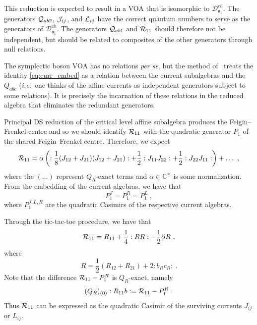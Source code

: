 \documentclass[a4paper]{article}
\def\IC{\mathbb{C}}
\def\JJ{{\cal J}}
\def\LL{{\cal L}}
\def\QQ{{\cal Q}}
\def\RR{{\cal R}}
\def\af{\mathfrak{a}}
\def \ie{{\it i.e.}}
\def\D{\mathcal{D}^{ch}}
\begin{document}
This reduction is expected to result in a VOA that is isomorphic to $\D_{\af_1}$. The generators $\QQ_{ab2}$, $\JJ_{ij}$, and $\LL_{ij}$ have the correct quantum numbers to serve as the generators of $\D_{\af_1}$. The generators $\QQ_{ab1}$ and $\RR_{11}$ should therefore not be independent, but should be related to composites of the other generators through null relations.

The symplectic boson VOA has no relations \emph{per se}, but the method of~\cite{Beem:2014rza} treats the identity \eqref{eq:curr_embed} as a relation between the current subalgebras and the $Q_{abc}$ (\ie\, one thinks of the affine currents as independent generators subject to some relations). It is precisely the incarnation of these relations in the reduced algebra that eliminates the redundant generators.

Principal DS reduction of the critical level affine subalgebra produces the Feigin--Frenkel centre and so we should identify $\RR_{11}$ with the quadratic generator $P_1$ of the shared Feigin--Frenkel centre. Therefore, we expect
\begin{equation}
	\RR_{11} = \alpha\left(:\frac{1}{8}(J_{12}+J_{21})(J_{12}+J_{21}): + \frac{1}{2}:J_{11}J_{22}: + \frac{1}{2}:J_{22}J_{11}: \right)+\ldots~,
\end{equation}
where the $(\dots)$ represent $Q_R$-exact terms and $\alpha\in\IC^\times$ is some normalization. From the embedding of the current algebras, we have that
\begin{equation}
	P_1^J=P_1^R=P_1^L~,
\end{equation}
where $P_1^{J,L,R}$ are the quadratic Casimirs of the respective current algebras.

Through the tic-tac-toe procedure, we have that
\begin{equation}
	\RR_{11} = R_{11} + \frac{1}{4} :RR:  - \frac{1}{2}\partial R~,
\end{equation}
where
\begin{equation}
	R = \frac{1}{2}\left(R_{12}+R_{21}\right) +2:b_Rc_R:~.
\end{equation}
Note that the difference $	\RR_{11}- P_1^R $ is $Q_R$-exact, namely
\begin{equation}
	(Q_{R})_{(0)} :R_{11}b: = \RR_{11}-P_1^R~.
\end{equation}
Thus $\RR_{11}$ can be expressed as the quadratic Casimir of the surviving currents $J_{ij}$ or $L_{ij}$.
\end{document}
